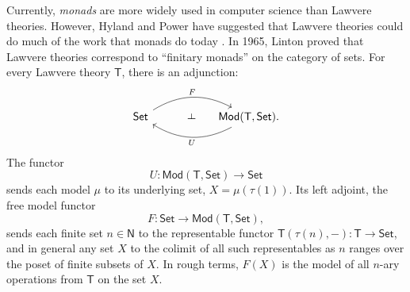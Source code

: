 \documentclass{amsart}
\theoremstyle{definition}
\def\ld{\rotatebox[origin=c]{-90}{$\dashv$}} %
\newcommand{\Set}{\mathsf{Set}}
\newcommand{\Mod}{\mathsf{Mod}}
\newcommand{\NN}{\mathsf{N}}
\newcommand{\T}{\mathsf{T}}
\newcommand{\maps}{\colon}
\begin{document}
\iffalse
\begin{center}
	\begin{minipage}{.2 \textwidth}
		\begin{prooftree}
			\Axiom$a \; ,\; b \fCenter \; :\T$
			\UnaryInf$a\times b \fCenter \; : \T$
		\end{prooftree}
	\end{minipage} \qquad
	\begin{minipage}{.2 \textwidth}
		\begin{prooftree}
			\Axiom$f \; :a\to b\; \fCenter ,\; g\; :c\to d$
			\UnaryInf$f\times g \; : \; a\;\times\fCenter \;b \; \to c\times d$
		\end{prooftree}
	\end{minipage} \qquad \qquad
	\begin{minipage}{.2 \textwidth}
		\begin{prooftree}
			\Axiom$h: d\to a\; ,\; \fCenter k:e\to b$
			\doubleLine
			\UnaryInf$\big\langle h,k \big\rangle :\; e \fCenter\;\to a\times b$
		\end{prooftree}
	\end{minipage}
\end{center}
\begin{center}
\begin{minipage}{.2 \textwidth}
	\begin{prooftree}
		\Axiom$a\times b \; \fCenter : \T$
		\UnaryInf$\pi_1 : a\times b\to a \; \fCenter \; ,\; \pi_2 : a\times b\to b$
	\end{prooftree}
\end{minipage} \qquad \qquad \qquad
\begin{minipage}{.2 \textwidth}
	\begin{prooftree}
		\Axiom$\big\langle h,k \big\rangle :\; e\; \fCenter\to a\times b$
		\UnaryInf$\pi_1 \big\langle h,k \big\rangle \equiv h \; \fCenter ,\; \pi_2 \big\langle h,k \big\rangle \equiv k$
	\end{prooftree}
\end{minipage}
\end{center}
\fi

Currently, \textit{monads} are more widely used in computer science than Lawvere theories.  However, Hyland and Power have suggested that Lawvere theories could do much of the work that monads do today \cite{hylandpower}. In 1965, Linton \cite{linton} proved that Lawvere theories correspond to ``finitary monads'' on the category of sets.   For every Lawvere theory $\T$, there is an adjunction:
\[\begin{tikzcd}[column sep=small]
\Set \arrow[bend left,below]{rr}{F}
& {\phantom{AA} \ld} &
\arrow[bend left,above]{ll}{U} \Mod(\T,\Set).
\end{tikzcd}\]
The functor 
\[  U \maps \Mod(\T,\Set) \to \Set \]
sends each model $\mu$ to its underlying set, $X = \mu(\tau(1))$. 
Its left adjoint, the free model functor 
\[       F \maps\Set \to \Mod(\T,\Set), \]
sends each finite set $n \in \NN$ to the representable functor $\T(\tau(n),-)\maps \T \to \Set$, and in general any set $X$ to the colimit of all such representables as $n$ ranges over the poset of finite subsets of $X$.   In rough terms, $F(X)$ is the model of all $n$-ary operations from $\T$ on the set $X$.
\end{document}
